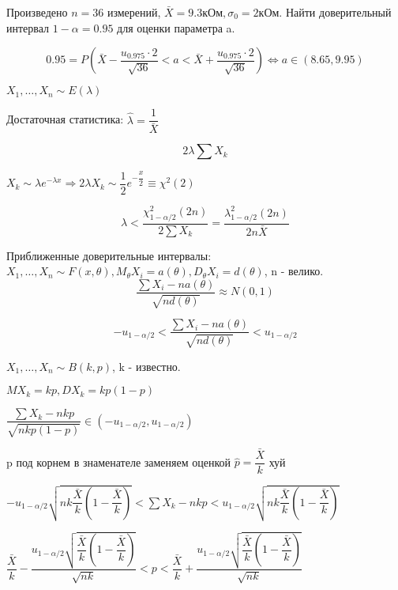 \begin{ex}
  Произведено $n=36$ измерений, $\bar X = 9.3 \text{кОм},  \sigma_0 = 2 \text{кОм}$. Найти доверительный интервал $1- \alpha = 0.95$ для оценки параметра a.

\[
  0.95 = P\left(\bar X - \dfrac{u_{0.975} \cdot 2}{\sqrt{36}} < a < \bar X + \dfrac{u_{0.975} \cdot 2}{\sqrt{36}}\right) \Leftrightarrow a \in (8.65, 9.95)
\]
\end{ex}

\begin{ex}
  $X_1, \dots, X_n \sim E(\lambda)$

  Достаточная статистика: $\hat \lambda = \dfrac{1}{\bar X}$

  $$2\lambda \sum X_k$$

  $X_k \sim \lambda e^{-\lambda x} \Rightarrow 2\lambda X_k \sim \dfrac{1}{2} e^{-\dfrac{x}{2}} \equiv \chi^2 (2)$

  $$\lambda < \dfrac{\chi^2_{1-\alpha/2} (2n)}{2 \sum X_k} = \dfrac{\lambda^2_{1-\alpha/2} (2n)}{2n \bar X}$$
\end{ex}

  Приближенные доверительные интервалы:
  $X_1, \dots, X_n \sim F(x, \theta), M_\theta X_i = a(\theta), D_\theta X_i = d(\theta)$, n - велико. 
  $$\dfrac{\sum X_i - n a(\theta)}{\sqrt{n d(\theta)}} \approx N(0, 1)$$

  $$- u_{1 - \alpha/2} < \dfrac{\sum X_i - n a(\theta)}{\sqrt{n d(\theta)}}< u_{1-\alpha/2}$$

\begin{ex}
  $X_1, \dots, X_n \sim B(k, p)$, k - известно.

  $M X_k = kp, D X_k = k p (1-p)$

  $\dfrac{\sum X_k - n k p}{\sqrt{nkp(1-p)}} \in (-u_{1-\alpha/2}, u_{1-\alpha/2})$

  p под корнем в знаменателе заменяем оценкой $\hat p = \dfrac{\bar X}{k}$ хуй

  $-u_{1-\alpha/2} \sqrt{nk \dfrac{\bar X}{k} (1 - \dfrac{\bar X}{k})} < \sum X_k - nkp < u_{1-\alpha/2} \sqrt{nk \dfrac{\bar X}{k} (1 - \dfrac{\bar X}{k})}$

  $\dfrac{\bar X}{k} - \dfrac{u_{1-\alpha/2} \sqrt{\dfrac{\bar X}{k} (1 - \dfrac{\bar X}{k})}}{\sqrt{nk}} < p < \dfrac{\bar X}{k} + \dfrac{u_{1-\alpha/2} \sqrt{\dfrac{\bar X}{k} (1 - \dfrac{\bar X}{k})}}{\sqrt{nk}}$
\end{ex}
